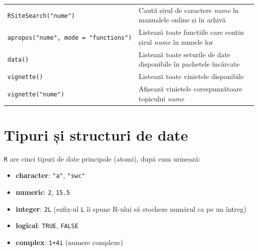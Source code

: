 \documentclass[]{article}
\providecommand{\tightlist}{%
  \setlength{\itemsep}{0pt}\setlength{\parskip}{0pt}}
\begin{document}
\begin{longtable}[]{@{}ll@{}}
\begin{minipage}[t]{0.27\columnwidth}
\texttt{RSiteSearch("nume")}\strut
\end{minipage} & \begin{minipage}[t]{0.34\columnwidth}\raggedright\strut
Caută șirul de caractere \emph{nume} în manualele online și în
arhivă\strut
\end{minipage}\tabularnewline
\begin{minipage}[t]{0.27\columnwidth}\raggedright\strut
\texttt{apropos("nume",\ mode\ =\ "functions")}\strut
\end{minipage} & \begin{minipage}[t]{0.34\columnwidth}\raggedright\strut
Listează toate funcțiile care conțin șirul \emph{nume} în numele
lor\strut
\end{minipage}\tabularnewline
\begin{minipage}[t]{0.27\columnwidth}\raggedright\strut
\texttt{data()}\strut
\end{minipage} & \begin{minipage}[t]{0.34\columnwidth}\raggedright\strut
Listează toate seturile de date disponibile în pachetele încărcate\strut
\end{minipage}\tabularnewline
\begin{minipage}[t]{0.27\columnwidth}\raggedright\strut
\texttt{vignette()}\strut
\end{minipage} & \begin{minipage}[t]{0.34\columnwidth}\raggedright\strut
Listează toate vinietele disponibile\strut
\end{minipage}\tabularnewline
\begin{minipage}[t]{0.27\columnwidth}\raggedright\strut
\texttt{vignette("nume")}\strut
\end{minipage} & \begin{minipage}[t]{0.34\columnwidth}\raggedright\strut
Afișează vinietele corespunzătoare topicului \emph{nume}\strut
\end{minipage}\tabularnewline
\bottomrule
\end{longtable}

\section{Tipuri și structuri de date}\label{tipuri-si-structuri-de-date}

\texttt{R} are cinci tipuri de date principale (atomi), după cum
urmează:

\begin{itemize}
\tightlist
\item
  \textbf{character}: \texttt{"a"}, \texttt{"swc"}
\item
  \textbf{numeric}: \texttt{2}, \texttt{15.5}
\item
  \textbf{integer}: \texttt{2L} (sufix-ul \texttt{L} îi spune R-ului să
  stocheze numărul ca pe un întreg)
\item
  \textbf{logical}: \texttt{TRUE}, \texttt{FALSE}
\item
  \textbf{complex}: \texttt{1+4i} (numere complexe)
\end{itemize}
\end{document}
